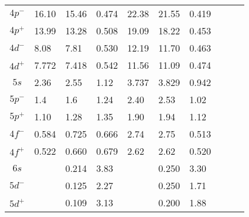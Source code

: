 \begin{tabularx}{\textwidth}{|c|YYY|YYY|YYY@{}|}
$4p^-$ & 16.10  & 15.46  & 0.474  & 22.38  & 21.55  & 0.419	\\
$4p^+$ & 13.99  & 13.28  & 0.508  & 19.09  & 18.22  & 0.453	\\
$4d^-$ & 8.08   & 7.81   & 0.530  & 12.19  & 11.70  & 0.463	\\
$4d^+$ & 7.772  & 7.418  & 0.542  & 11.56  & 11.09  & 0.474	\\
$5s$   & 2.36   & 2.55   & 1.12   & 3.737  & 3.829  & 0.942	\\
$5p^-$ & 1.4    & 1.6    & 1.24   & 2.40   & 2.53   & 1.02	\\
$5p^+$ & 1.10   & 1.28   & 1.35   & 1.90   & 1.94   & 1.12	\\
$4f^-$ & 0.584  & 0.725  & 0.666  & 2.74   & 2.75   & 0.513	\\
$4f^+$ & 0.522  & 0.660  & 0.679  & 2.62   & 2.62   & 0.520	\\
$6s$   &        & 0.214  & 3.83   &        & 0.250  & 3.30	\\
$5d^-$ &        & 0.125  & 2.27   &        & 0.250  & 1.71	\\
$5d^+$ &        & 0.109  & 3.13   &        & 0.200  & 1.88	\\
\end{tabularx}


